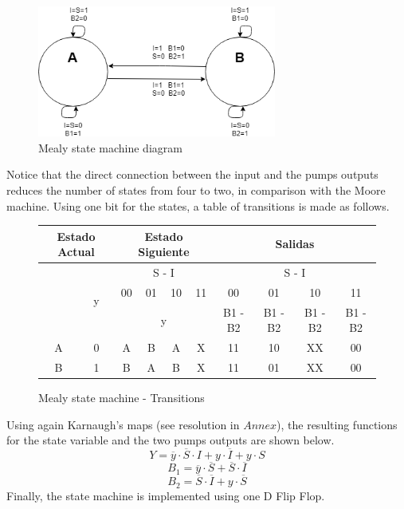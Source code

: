 \begin{figure}[H]
    \begin{centering}
    \includegraphics[width=0.7\textwidth]{data/Graficos1/1b_fsm.png}
    \par\end{centering}
    \caption{Mealy state machine diagram}
\end{figure}

Notice that the direct connection between the 
input and the pumps outputs reduces the number 
of states from four to two, in comparison with 
the Moore machine.
Using one bit for the states, a table of transitions
is made as follows.

\begin{figure}[H]
\begin{centering}
\begin{tabular}{|c|c|c|c|c|c||c|c|c|c|}
    \hline 
    \multicolumn{2}{|c|}{Estado Actual} & \multicolumn{4}{c||}{Estado Siguiente} & \multicolumn{4}{c|}{Salidas}\tabularnewline
    \hline 
    \hline 
    \multirow{3}{*}{} & \multirow{3}{*}{y} & \multicolumn{4}{c||}{S - I} & \multicolumn{4}{c|}{S - I}\tabularnewline
    \cline{3-10} 
     &  & 00 & 01 & 10 & 11 & 00 & 01 & 10 & 11\tabularnewline
    \cline{3-10} 
     &  & \multicolumn{4}{c||}{y} & B1 - B2 & B1 - B2 & B1 - B2 & B1 - B2\tabularnewline
    \hline 
    A & 0 & A & B & A & X & 11 & 10 & XX & 00\tabularnewline
    \hline 
    B & 1 & B & A & B & X & 11 & 01 & XX & 00\tabularnewline
    \hline 
    \end{tabular}
    \caption{Mealy state machine - Transitions}
\end{centering}
\end{figure}

Using again Karnaugh's maps (see resolution in $Annex$), the resulting functions for
the state variable and the two pumps outputs are shown below.
$$Y = \overline{y} \cdot \overline{S} \cdot I + y \cdot \overline{I} + y \cdot S$$ 
$$B_1 = \overline{y} \cdot \overline{S} + \overline{S} \cdot \overline{I}$$
$$B_2 = \overline{S} \cdot \overline{I} + y \cdot \overline{S}$$
Finally, the state machine is implemented using
one D Flip Flop.

